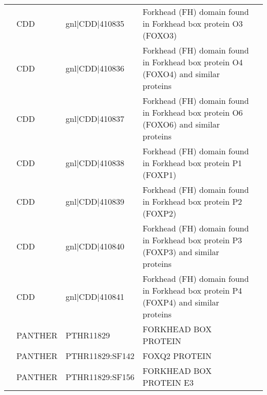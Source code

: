 \documentclass[../main.tex]{subfiles}
\begin{document}
\begin{landscape}
\begin{longtable}{@{}cllll@{}}
		                                & CDD                  & gnl|CDD|410835  & Forkhead (FH) domain found in Forkhead box protein O3 (FOXO3)                                                                                & \\
		                                & CDD                  & gnl|CDD|410836  & Forkhead (FH) domain found in Forkhead box protein O4 (FOXO4) and similar proteins                                                           & \\
		                                & CDD                  & gnl|CDD|410837  & Forkhead (FH) domain found in Forkhead box protein O6 (FOXO6) and similar proteins                                                           & \\
		                                & CDD                  & gnl|CDD|410838  & Forkhead (FH) domain found in Forkhead box protein P1 (FOXP1)                                                                                & \\
		                                & CDD                  & gnl|CDD|410839  & Forkhead (FH) domain found in Forkhead box protein P2 (FOXP2)                                                                                & \\
		                                & CDD                  & gnl|CDD|410840  & Forkhead (FH) domain found in Forkhead box protein P3 (FOXP3) and similar proteins                                                           & \\
		                                & CDD                  & gnl|CDD|410841  & Forkhead (FH) domain found in Forkhead box protein P4 (FOXP4) and similar proteins                                                           & \\
		                                & PANTHER              & PTHR11829       & FORKHEAD BOX PROTEIN                                                                                                                         & \\
		                                & PANTHER              & PTHR11829:SF142 & FOXQ2 PROTEIN                                                                                                                                & \\
		                                & PANTHER              & PTHR11829:SF156 & FORKHEAD BOX PROTEIN E3                                                                                                                      & \\

\end{longtable}
\end{landscape}
\end{document}

